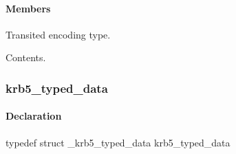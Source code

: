 \documentclass[letterpaper,10pt,english]{sphinxmanual}
\begin{document}
\paragraph{Members}
\label{appdev/refs/types/krb5_transited:members}

\begin{fulllineitems}
\label{appdev/refs/types/krb5_transited:c.krb5_transited.magic}
\end{fulllineitems}


\begin{fulllineitems}
\label{appdev/refs/types/krb5_transited:c.krb5_transited.tr_type}
Transited encoding type.

\end{fulllineitems}


\begin{fulllineitems}
\label{appdev/refs/types/krb5_transited:c.krb5_transited.tr_contents}
Contents.

\end{fulllineitems}



\subsubsection{krb5\_typed\_data}
\label{appdev/refs/types/krb5_typed_data:krb5-typed-data-struct}\label{appdev/refs/types/krb5_typed_data::doc}\label{appdev/refs/types/krb5_typed_data:krb5-typed-data}

\begin{fulllineitems}
\label{appdev/refs/types/krb5_typed_data:c.krb5_typed_data}
\end{fulllineitems}



\paragraph{Declaration}
\label{appdev/refs/types/krb5_typed_data:declaration}
typedef struct \_krb5\_typed\_data  krb5\_typed\_data
\end{document}
